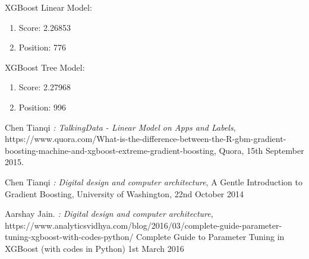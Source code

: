 \documentclass{article}
\begin{document}
XGBoost Linear Model:
\begin{enumerate}
    \item Score: 2.26853
    \item Position: 776
\end{enumerate}

XGBoost Tree Model:
\begin{enumerate}
     \item Score: 2.27968
    \item Position: 996   
\end{enumerate}


{}


\begin{thebibliography}{9}

Chen Tianqi
\emph{: TalkingData - Linear Model on Apps and Labels},
https://www.quora.com/What-is-the-difference-between-the-R-gbm-gradient-boosting-machine-and-xgboost-extreme-gradient-boosting,
Quora,
15th September 2015.
  
Chen Tianqi
\emph{: Digital design and computer architecture},  
A Gentle Introduction to Gradient Boosting,
University of Washington,
22nd October 2014

Aarshay Jain. 
\emph{: Digital design and computer architecture},  
https://www.analyticsvidhya.com/blog/2016/03/complete-guide-parameter-tuning-xgboost-with-codes-python/
Complete Guide to Parameter Tuning in XGBoost (with codes in Python)
1st March 2016

\end{thebibliography}
\end{document}
